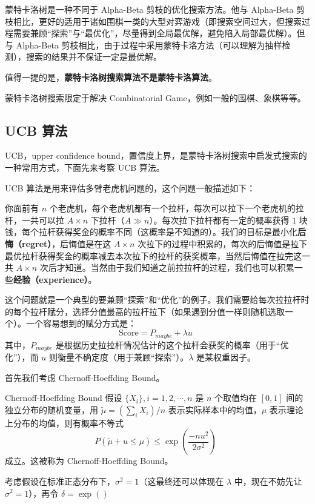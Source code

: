 
\begin{issues}
\issueDraft
\issueTODO
\end{issues}


蒙特卡洛树是一种不同于 Alpha-Beta 剪枝的优化搜索方法。他与 Alpha-Beta 剪枝相比，更好的适用于诸如围棋一类的大型对弈游戏（即搜索空间过大，但搜索过程需要兼顾“探索”与“最优化”，尽量得到全局最优解，避免陷入局部最优解）。但与 Alpha-Beta 剪枝相比，由于过程中采用蒙特卡洛方法（可以理解为抽样检测），搜索的结果并不保证一定是最优解。

值得一提的是，\textbf{蒙特卡洛树搜索算法不是蒙特卡洛算法}。

蒙特卡洛树搜索限定于解决 Combinatorial Game，例如一般的围棋、象棋等等。

\subsection{UCB 算法}
UCB，upper confidence bound，置信度上界，是蒙特卡洛树搜索中启发式搜索的一种常用方式，下面先来考察 UCB 算法。





UCB 算法是用来评估多臂老虎机问题的，这个问题一般描述如下：

你面前有 $n$ 个老虎机，每个老虎机都有一个拉杆，每次可以拉下一个老虎机的拉杆，一共可以拉 $A\times n$ 下拉杆（$A \gg n$）。每次拉下拉杆都有一定的概率获得 $1$ 块钱，每个拉杆获得奖金的概率不同（这概率是不知道的）。我们的目标是最小化\textbf{后悔（regret）}，后悔值是在这 $A\times n$ 次拉下的过程中积累的，每次的后悔值是拉下最优拉杆获得奖金的概率减去本次拉下的拉杆的获奖概率，当然后悔值在拉完这一共 $A\times n$ 次后才知道。当然由于我们知道之前拉拉杆的过程，我们也可以积累一些\textbf{经验（experience）}。

这个问题就是一个典型的要兼顾“探索”和“优化”的例子。我们需要给每次拉拉杆时的每个拉杆赋分，选择分值最高的拉杆拉下（如果遇到分值一样则随机选取一个）。一个容易想到的赋分方式是：
$$\text{Score} = P_{maybe} + \lambda u ~~$$
其中，$P_{maybe}$ 是根据历史拉拉杆情况估计的这个拉杆会获奖的概率（用于“优化”），而 $u$ 则衡量不确定度（用于兼顾“探索”）。$\lambda$ 是某权重因子。

首先我们考虑 Chernoff-Hoeffding Bound。
\begin{theorem}{Chernoff-Hoeffding Bound}
假设 $\{X_i\}, i=1, 2, \cdots, n$ 是 $n$ 个取值均在 $[0, 1]$ 间的独立分布的随机变量，用 $\widetilde \mu = \left(\sum_{i} X_i\right)/n$ 表示实际样本中的均值，$\mu$ 表示理论上分布的均值，则有概率不等式
$$P\left(\widetilde \mu + u \le \mu\right) \le \exp\left(\frac{-n u^2}{2 \sigma^2}\right) ~~$$
成立。这被称为 Chernoff-Hoeffding Bound。
\end{theorem}
考虑假设在标准正态分布下，$\sigma^2=1$（这最终还可以体现在 $\lambda$ 中，现在不妨先让 $\sigma^2=1$），再令 $\delta = \exp\left(\right)$




